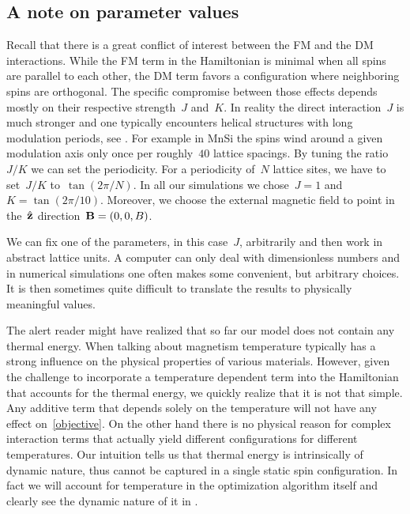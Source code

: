 
\subsection{A note on parameter values}

Recall that there is a great conflict of interest between the FM and
the DM interactions. While the FM term in the Hamiltonian is minimal when all
spins are parallel to each other, the DM term favors a configuration where
neighboring spins are orthogonal. The specific compromise between those effects
depends mostly on their respective strength~$J$ and~$K$. In reality the direct
interaction~$J$ is much stronger and one typically encounters helical
structures with long modulation periods, see . For example in MnSi
the spins wind around a given modulation axis only once per roughly~$40$ lattice
spacings. By tuning the ratio~$J/K$ we can set the periodicity. For a
periodicity of~$N$ lattice sites, we have to set~$J/K$ to~$\tan(2\pi / N)$. In
all our simulations we chose~$J=1$ and~$K=\tan(2\pi / 10)$. Moreover, we choose
the external magnetic field to point in the~$\hat{\mathbf{z}}$ direction~$\mathbf{B}=(0,0,B)$.

We can fix one of the parameters, in this case~$J$, arbitrarily and then work in
abstract lattice units. A computer can only deal with dimensionless numbers and
in numerical simulations one often makes some convenient, but arbitrary choices.
It is then sometimes quite difficult to translate the results to physically
meaningful values.

The alert reader might have realized that so far our model does not contain any
thermal energy. When talking about magnetism temperature typically has a strong
influence on the physical properties of various materials. However, given the
challenge to incorporate a temperature dependent term into the Hamiltonian that
accounts for the thermal energy, we quickly realize that it is not that simple.
Any additive term that depends solely on the temperature will not have any
effect on~\eqref{objective}. On the other hand there is no physical reason for
complex interaction terms that actually yield different configurations for
different temperatures. Our intuition tells us that thermal energy is
intrinsically of dynamic nature, thus cannot be captured in a single static spin
configuration. In fact we will account for temperature in the optimization
algorithm itself and clearly see the dynamic nature of it in .

